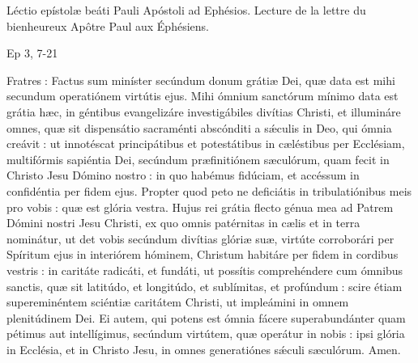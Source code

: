 \begin{paracol}{2}
Léctio epístolæ beáti Pauli Apóstoli ad Ephésios.
\switchcolumn
Lecture de la lettre du bienheureux Apôtre Paul aux Éphésiens.
\switchcolumn*

Ep 3, 7-21
\switchcolumn

\switchcolumn*

Fratres : Factus sum miníster  secúndum donum grátiæ Dei, quæ data est mihi secundum operatiónem virtútis ejus. Mihi ómnium sanctórum mínimo data est grátia hæc, in géntibus evangelizáre investigábiles divítias Christi, et illumináre omnes, quæ sit dispensátio sacraménti abscónditi a sǽculis in Deo, qui ómnia creávit : ut innotéscat principátibus et potestátibus in cæléstibus per Ecclésiam, multifórmis sapiéntia Dei, secúndum præfinitiónem sæculórum, quam fecit in Christo Jesu Dómino nostro : in quo habémus fidúciam, et accéssum in confidéntia per fidem ejus. Propter quod peto ne deficiátis in tribulatiónibus meis pro vobis : quæ est glória vestra. Hujus rei grátia flecto génua mea ad Patrem Dómini nostri Jesu Christi, ex quo omnis patérnitas in cælis et in terra nominátur, ut det vobis secúndum divítias glóriæ suæ, virtúte corroborári per Spíritum ejus in interiórem hóminem, Christum habitáre per fidem in cordibus vestris : in caritáte radicáti, et fundáti, ut possítis comprehéndere cum ómnibus sanctis, quæ sit latitúdo, et longitúdo, et sublímitas, et profúndum : scire étiam supereminéntem sciéntiæ caritátem Christi, ut impleámini in omnem plenitúdinem Dei. Ei autem, qui potens est ómnia fácere superabundánter quam pétimus aut intellígimus, secúndum virtútem, quæ operátur in nobis : ipsi glória in Ecclésia, et in Christo Jesu, in omnes generatiónes sǽculi sæculórum. Amen.
\switchcolumn

\end{paracol}
